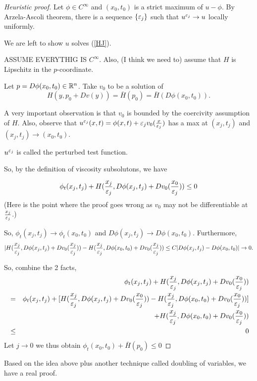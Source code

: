\documentclass[11pt, oneside]{amsart}   	%
\begin{document}
\begin{proof}[Heuristic proof]
	Let $\phi\in C^\infty$ and $(x_0, t_0)$ is a strict maximum of $u-\phi$.
	By Arzela-Ascoli theorem, there is a sequence $\{\varepsilon_j\}$ such that $u^{\varepsilon_j}\to u$ locally uniformly.

	We are left to show $u$ solves (\ref{HJ}).

	ASSUME EVERYTHIG IS $C^\infty$. Also, (I think we need to) assume that $H$ is Lipschitz in the $p$-coordinate.
	
	Let $p=D\phi(x_0, t_0)\in \mathbb{R}^n$. Take $v_0$ to be a solution of
	$$H(y, p_0 + Dv(y))=\bar{H}(p_0)=\bar{H}(D\phi(x_0, t_0)).$$
	
	A very important observation is that $v_0$ is bounded by the coercivity assumption of $H$. Also, 
	observe that $u^{\varepsilon_j}(x, t) = \phi(x, t) + \varepsilon_j v_0(\frac{x}{\varepsilon_j})$ has a max at $(x_j, t_j)$ and $(x_j, t_j)\to (x_0, t_0)$. 
	
	$u^{\varepsilon_j}$ is called the perturbed test function.
	
	So, by the definition of viscosity subsolutons, we have
	
	$$\phi_t(x_j, t_j) + H(\frac{x_j}{\varepsilon_j}, D\phi(x_j, t_j) + Dv_0(\frac{x_0}{\varepsilon_j}))\le 0$$
		(Here is the point where the proof goes wrong as $v_0$ may not be differentiable at $\frac{x_j}{\varepsilon_j}$.)
		
		So, $\phi_t(x_j, t_j)\to \phi_t(x_0, t_0)$ and $D\phi(x_j, t_j)\to D\phi(x_0, t_0)$. Furthermore,
		$$|H(\frac{x_j}{\varepsilon_j}, D\phi(x_j, t_j) + Dv_0(\frac{x_j}{\varepsilon_j}))-H(\frac{x_j}{\varepsilon_j}, D\phi(x_0, t_0) + Dv_0(\frac{x_j}{\varepsilon_j})) \le C|D\phi(x_j, t_j) - D\phi(x_0, t_0)| \to 0.$$
		
		So, combine the 2 facts,
		\begin{eqnarray*}
			&&\phi_t(x_j, t_j) + H(\frac{x_j}{\varepsilon_j}, D\phi(x_j, t_j) + Dv_0(\frac{x_0}{\varepsilon_j}))\\ &=& \phi_t(x_j, t_j) + [H(\frac{x_j}{\varepsilon_j}, D\phi(x_j, t_j) + Dv_0(\frac{x_0}{\varepsilon_j})) - H(\frac{x_j}{\varepsilon_j}, D\phi(x_0, t_0) + Dv_0(\frac{x_0}{\varepsilon_j}))]\\ &&+ H(\frac{x_j}{\varepsilon_j}, D\phi(x_0, t_0) + Dv_0(\frac{x_0}{\varepsilon_j}))\\
			&\le& 0
		\end{eqnarray*}
		Let $j\to 0$ we thus obtain $\phi_t(x_0, t_0) + \bar{H}(p_0)\le 0$
\end{proof}

Based on the idea above plus another technique called doubling of variables, we have a real proof.
\end{document}
